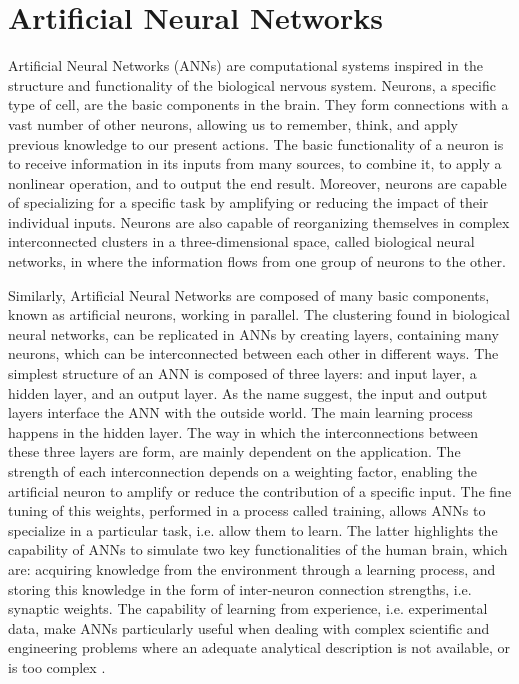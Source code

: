 \section{Artificial Neural Networks}

Artificial Neural Networks (ANNs) are computational systems inspired in the structure and functionality of the biological nervous system. Neurons, a specific type of cell, are the basic components in the brain. They form connections with a vast number of other neurons, allowing us to remember, think, and apply previous knowledge to our present actions. The basic functionality of a neuron is to receive information in its inputs from many sources, to combine it, to apply a nonlinear operation, and to output the end result. Moreover, neurons are capable of specializing for a specific task by amplifying or reducing the impact of their individual inputs. Neurons are also capable of reorganizing themselves in complex interconnected clusters in a three-dimensional space, called biological neural networks, in where the information flows from one group of neurons to the other.

Similarly, Artificial Neural Networks are composed of many basic components, known as artificial neurons, working in parallel. The clustering found in biological neural networks, can be replicated in ANNs by creating layers, containing many neurons, which can be interconnected between each other in different ways. The simplest structure of an ANN is composed of three layers: and input layer, a hidden layer, and an output layer. As the name suggest, the input and output layers interface the ANN with the outside world. The main learning process happens in the hidden layer. The way in which the interconnections between these three layers are form, are mainly dependent on the application. The strength of each interconnection depends on a weighting factor, enabling the artificial neuron to amplify or reduce the contribution of a specific input. The fine tuning of this weights, performed in a process called training, allows ANNs to specialize in a particular task, i.e. allow them to learn. The latter highlights the capability of ANNs to simulate two key functionalities of the human brain, which are: acquiring knowledge from the environment through a learning process, and storing this knowledge in the form of inter-neuron connection strengths, i.e. synaptic weights. The capability of learning from experience, i.e. experimental data, make ANNs particularly useful when dealing with complex scientific and engineering problems where an adequate analytical description is not available, or is too complex  \cite{zhang2003artificial,trebar2007predicting}.

